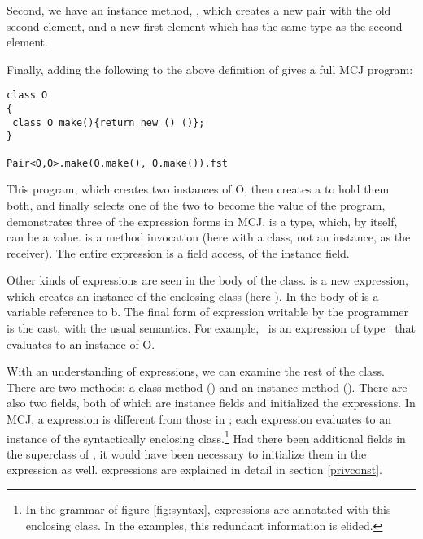 \documentclass{acm-sigplan}
\begin{document}
Second, we have an instance method, {}, which creates a new
pair with the old second element, and a new first element which has
the same type as the second element.

Finally, adding the following to the above definition of {}
gives a full MCJ program:

\begin{verbatim}
class O
{
 class O make(){return new () ()};
}

Pair<O,O>.make(O.make(), O.make()).fst
\end{verbatim}

This program, which creates two instances of {\txt O}, then creates
a {} to hold them both, and finally selects one of the two to
become the value of the program, demonstrates three of the expression
forms in MCJ.  {} is a type, which, by itself, can
be a value.  {} is a method invocation (here with a
class, not an instance, as the receiver).  The entire expression is a
field access, of the {} instance field.

Other kinds of expressions are seen in the body of the {}
class.  {} is a new expression, which creates an
instance of the enclosing class (here {}).  In the body of
{} is a variable reference to {\txt b}.  The final form of
expression writable by the programmer is the cast, with the usual
semantics. For example, {}\ is an expression of
type \Object\ that evaluates to an instance of {\txt O}.

With an understanding of expressions, we can examine the rest of the
{} class.  There are two methods: a class method
({}) and an instance method ({}).  There are
also two fields, both of which are instance fields and initialized the
{} expressions. In MCJ, a {} expression is different
from those in \FGJ; each {} expression evaluates to an
instance of the syntactically enclosing class.\footnote{In the grammar
of figure \ref{fig:syntax}, {} expressions are annotated with
this enclosing class.  In the examples, this redundant information is
elided.}  Had there been additional fields in the superclass of
{}, it would have been necessary to initialize them in the
{} expression as well. {} expressions are explained
in detail in section \ref{privconst}.

\end{document}

